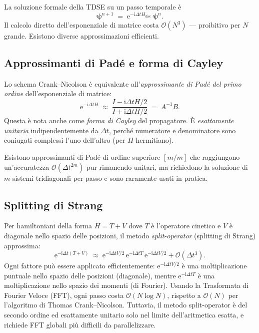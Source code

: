 \documentclass[12pt, a4paper]{article}
\newcommand{\dt}{\Delta t}
\newcommand{\ii}{\mathrm{i}}          %
\newcommand{\ee}{\mathrm{e}}          %
\newcommand{\CN}{Crank--Nicolson}
\begin{document}
La soluzione formale della TDSE su un passo temporale è
\begin{equation}
  \boldsymbol{\psi}^{n+1} \;=\;
  \ee^{-\ii\dt H_\text{disc}}\,\boldsymbol{\psi}^n.
\end{equation}
Il calcolo diretto dell'esponenziale di matrice costa $\mathcal{O}(N^3)$
--- proibitivo per $N$ grande.  Esistono diverse approssimazioni
efficienti.

\subsection{Approssimanti di Padé e forma di Cayley}

Lo schema \CN{} è equivalente all'\emph{approssimante di Padé del
primo ordine} dell'esponenziale di matrice:
\begin{equation}
  \ee^{-\ii\dt H} \;\approx\;
  \frac{I - \ii\dt H/2}{I + \ii\dt H/2}
  \;=\; A^{-1}B.
  \label{eq:cayley}
\end{equation}
Questa è nota anche come \emph{forma di Cayley} del propagatore.
È \emph{esattamente unitaria} indipendentemente da $\dt$, perché
numeratore e denominatore sono coniugati complessi l'uno dell'altro
(per $H$ hermitiano).

Esistono approssimanti di Padé di ordine superiore $[m/m]$ che
raggiungono un'accuratezza $\mathcal{O}(\dt^{2m})$ pur rimanendo
unitari, ma richiedono la soluzione di $m$ sistemi tridiagonali per
passo e sono raramente usati in pratica.

\subsection{Splitting di Strang}

Per hamiltoniani della forma $H = T + V$ dove $T$ è l'operatore
cinetico e $V$ è diagonale nello spazio delle posizioni, il metodo
\emph{split-operator} (splitting di Strang) approssima:
\begin{equation}
  \ee^{-\ii\dt(T+V)} \;\approx\;
  \ee^{-\ii\dt V/2}\,\ee^{-\ii\dt T}\,\ee^{-\ii\dt V/2}
  + \mathcal{O}(\dt^3).
\end{equation}
Ogni fattore può essere applicato efficientemente:
$\ee^{-\ii\dt V/2}$ è una moltiplicazione puntuale nello spazio delle
posizioni (diagonale), mentre $\ee^{-\ii\dt T}$ è una moltiplicazione
nello spazio dei momenti (di Fourier).  Usando la Trasformata di
Fourier Veloce (FFT), ogni passo costa $\mathcal{O}(N\log N)$, rispetto
a $\mathcal{O}(N)$ per l'algoritmo di Thomas \CN{}.  Tuttavia, il
metodo split-operator è del secondo ordine ed esattamente unitario
solo nel limite dell'aritmetica esatta, e richiede FFT globali più
difficili da parallelizzare.
\end{document}
